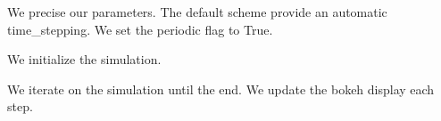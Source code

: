 \documentclass[letterpaper,10pt,english]{sphinxmanual}
\begin{document}
\noindent{}

We precise our parameters. The default scheme provide an automatic
time\_stepping. We set the periodic flag to True.

\begin{sphinxVerbatim}[commandchars=\\\{\}]
    
\end{sphinxVerbatim}

We initialize the simulation.

\begin{sphinxVerbatim}[commandchars=\\\{\}]
  
     
                         
\end{sphinxVerbatim}

We iterate on the simulation until the end. We update the bokeh display
each step.
\end{document}
